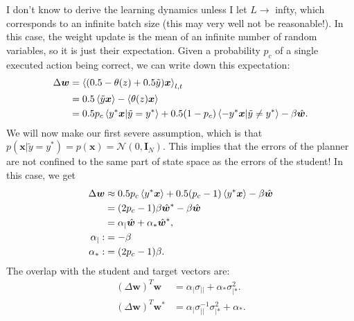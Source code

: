 \documentclass{article}
\renewcommand\b\bm
\begin{document}
I don't know to derive the learning dynamics unless I let $L \rightarrow$ infty, which corresponds to an infinite batch size (this may very well not be reasonable!).
In this case, the weight update is the mean of an infinite number of random variables, so it is just their expectation.
Given a probability $p_c$ of a single executed action being correct, we can write down this expectation:
\begin{align}
    \Delta \b{w} &= \braket{(0.5-\theta(z)+0.5 \tilde{y}) \b{x}}_{l, t} \\
    &= 0.5 \braket{\tilde{y} \b{x}} - \braket{\theta(z) \b{x}}\\
    &= 0.5 p_c \braket{y^* \b{x} | \tilde{y} = y^*} + 0.5 (1-p_c) \braket{ - y^* \b{x} | \tilde{y} \neq y^*} - \beta \hat{\b{w}}.
\end{align}
We will now make our first severe assumption, which is that $p(\b{x} | \tilde{y}=y^*) = p(\b{x}) = \mathcal{N}(0, \b{I}_N)$.
This implies that the errors of the planner are not confined to the same part of state space as the errors of the student!
In this case, we get
\begin{align}
    \Delta \b{w} & \approx 0.5 p_c \braket{y^* \b{x}} + 0.5 (p_c-1) \braket{ y^* \b{x}} - \beta \hat{\b{w}}\\
    &= (2 p_c - 1) \beta \hat{\b{w}}^* - \beta \hat{\b{w}}\\
    &= \alpha_{|} \hat{\b{w}} + \alpha_{*} \hat{\b{w}}^*,\\
    \alpha_{|} :&= - \beta\\
    \alpha_* :&= (2 p_c - 1) \beta.
\end{align}
The overlap with the student and target vectors are:
\begin{align}
    \label{eq:overlaps}
    (\Delta \b{w})^T \b{w} &= \alpha_| \sigma_{||} + \alpha_* \sigma_{|*}^2.\\
    (\Delta \b{w})^T \b{w}^* &= \alpha_| \sigma_{||}^{-1} \sigma_{|*}^2 + \alpha_*.\\
\end{align}
\end{document}
